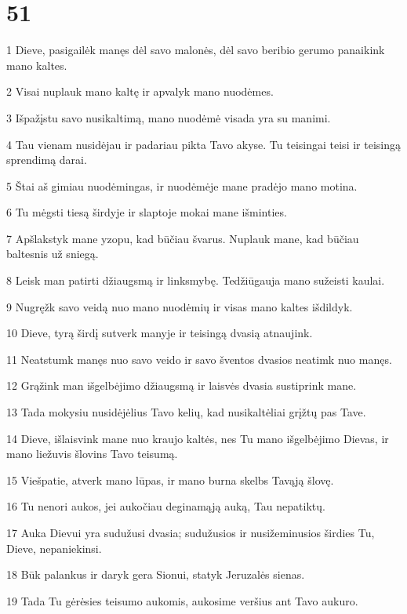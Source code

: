 \chapter{51}


\par 1 Dieve, pasigailėk manęs dėl savo malonės, dėl savo beribio gerumo panaikink mano kaltes. 
\par 2 Visai nuplauk mano kaltę ir apvalyk mano nuodėmes. 
\par 3 Išpažįstu savo nusikaltimą, mano nuodėmė visada yra su manimi. 
\par 4 Tau vienam nusidėjau ir padariau pikta Tavo akyse. Tu teisingai teisi ir teisingą sprendimą darai. 
\par 5 Štai aš gimiau nuodėmingas, ir nuodėmėje mane pradėjo mano motina. 
\par 6 Tu mėgsti tiesą širdyje ir slaptoje mokai mane išminties. 
\par 7 Apšlakstyk mane yzopu, kad būčiau švarus. Nuplauk mane, kad būčiau baltesnis už sniegą. 
\par 8 Leisk man patirti džiaugsmą ir linksmybę. Tedžiūgauja mano sužeisti kaulai. 
\par 9 Nugręžk savo veidą nuo mano nuodėmių ir visas mano kaltes išdildyk. 
\par 10 Dieve, tyrą širdį sutverk manyje ir teisingą dvasią atnaujink. 
\par 11 Neatstumk manęs nuo savo veido ir savo šventos dvasios neatimk nuo manęs. 
\par 12 Grąžink man išgelbėjimo džiaugsmą ir laisvės dvasia sustiprink mane. 
\par 13 Tada mokysiu nusidėjėlius Tavo kelių, kad nusikaltėliai grįžtų pas Tave. 
\par 14 Dieve, išlaisvink mane nuo kraujo kaltės, nes Tu mano išgelbėjimo Dievas, ir mano liežuvis šlovins Tavo teisumą. 
\par 15 Viešpatie, atverk mano lūpas, ir mano burna skelbs Tavąją šlovę. 
\par 16 Tu nenori aukos, jei aukočiau deginamąją auką, Tau nepatiktų. 
\par 17 Auka Dievui yra sudužusi dvasia; sudužusios ir nusižeminusios širdies Tu, Dieve, nepaniekinsi. 
\par 18 Būk palankus ir daryk gera Sionui, statyk Jeruzalės sienas. 
\par 19 Tada Tu gėrėsies teisumo aukomis, aukosime veršius ant Tavo aukuro.



